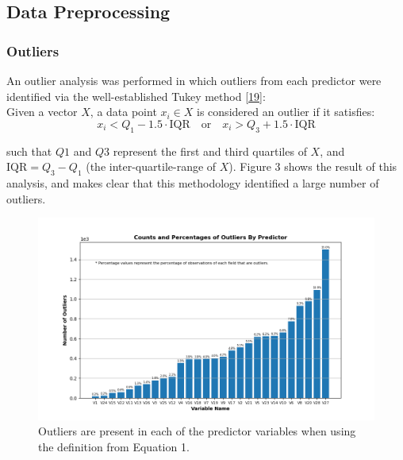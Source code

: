 \documentclass[11pt, oneside]{article}   	%
\begin{document}


\subsection{Data Preprocessing}




\subsubsection{Outliers}

An outlier analysis was performed in which outliers from each predictor were identified via the well-established Tukey method [\href{https://books.google.com/books/about/Exploratory_Data_Analysis.html?id=UT9dAAAAIAAJ}{19}]: \\

Given a vector $X$, a data point $x_i \in X$ is considered an outlier if it satisfies:
\begin{equation}
	x_i < Q_1 - 1.5 \cdot \text{IQR} \quad \text{or} \quad x_i > Q_3 + 1.5 \cdot \text{IQR}
\end{equation}

\noindent such that $Q1$ and $Q3$ represent the first and third quartiles of $X$, and $\text{IQR} = Q_3 - Q_1$ (the inter-quartile-range of $X$). Figure 3 shows the result of this analysis, and makes clear that this methodology identified a large number of outliers.\\

\begin{figure}[h!]
	\centering
	\includegraphics[width=1.0\textwidth]{figures/fig_3.png}
	\captionsetup{font=small} 
	\caption{Outliers are present in each of the predictor variables when using the definition from Equation 1.}
	\label{fig3}
\end{figure}
\end{document}
